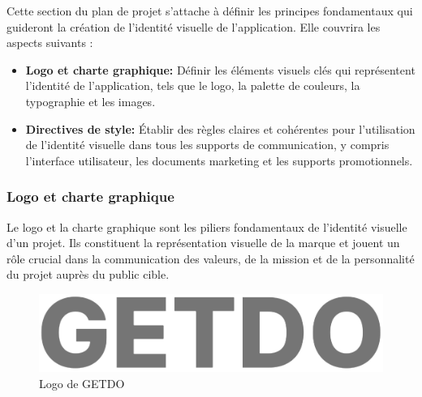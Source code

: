 \documentclass[a4paper,12pt]{report}
\begin{document}
Cette section du plan de projet s'attache à définir les principes fondamentaux qui guideront la création de l'identité visuelle de l'application. Elle couvrira les aspects suivants :

\begin{itemize}
  \item \textbf{Logo et charte graphique:} Définir les éléments visuels clés qui représentent l'identité de l'application, tels que le logo, la palette de couleurs, la typographie et les images.
  
  \item \textbf {Directives de style:} Établir des règles claires et cohérentes pour l'utilisation de l'identité visuelle dans tous les supports de communication, y compris l'interface utilisateur, les documents marketing et les supports promotionnels.
\end{itemize}
\subsubsection{Logo et charte graphique}
Le logo et la charte graphique sont les piliers fondamentaux de l'identité visuelle d'un projet. Ils constituent la représentation visuelle de la marque et jouent un rôle crucial dans la communication des valeurs, de la mission et de la personnalité du projet auprès du public cible.

\begin{figure}[h!]
    \includegraphics[width=1\textwidth]{./images/GETDO_logo.png}
    \caption{Logo de GETDO}
    \label{fig:jira_project_task}
\end{figure}
\end{document}
